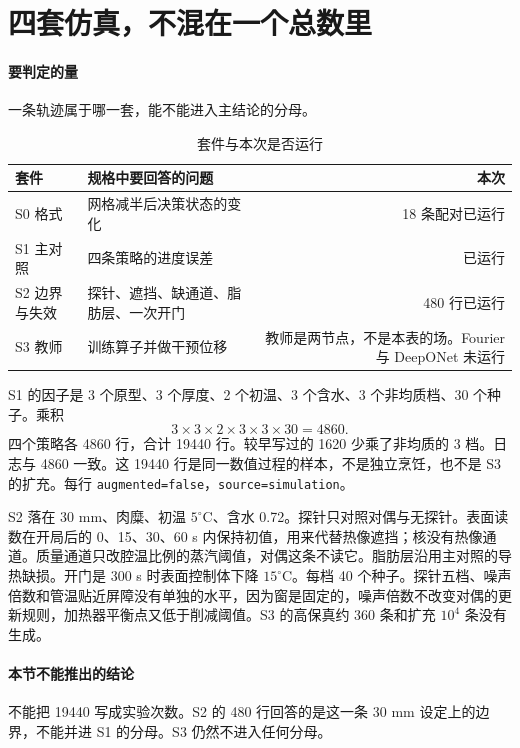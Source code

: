 \section{四套仿真，不混在一个总数里}

\paragraph{要判定的量}
一条轨迹属于哪一套，能不能进入主结论的分母。

\begin{table}[ht]
\centering
\caption{套件与本次是否运行}
\begin{tabularx}{\textwidth}{lXr}
\toprule
套件 & 规格中要回答的问题 & 本次 \\
\midrule
S0 格式 & 网格减半后决策状态的变化 & 18 条配对已运行 \\
S1 主对照 & 四条策略的进度误差 & 已运行 \\
S2 边界与失效 & 探针、遮挡、缺通道、脂肪层、一次开门 & 480 行已运行 \\
S3 教师 & 训练算子并做干预位移 & 教师是两节点，不是本表的场。Fourier 与 DeepONet 未运行 \\
\bottomrule
\end{tabularx}
\end{table}

S1 的因子是 3 个原型、3 个厚度、2 个初温、3 个含水、3 个非均质档、30 个种子。乘积
\begin{equation}
3\times 3\times 2\times 3\times 3\times 30=4860.
\end{equation}
四个策略各 4860 行，合计 19440 行。较早写过的 1620 少乘了非均质的 3 档。日志与 4860 一致。这 19440 行是同一数值过程的样本，不是独立烹饪，也不是 S3 的扩充。每行 \texttt{augmented=false}，\texttt{source=simulation}。

S2 落在 30 mm、肉糜、初温 \(5^\circ\mathrm{C}\)、含水 0.72。探针只对照对偶与无探针。表面读数在开局后的 0、15、30、60 s 内保持初值，用来代替热像遮挡；核没有热像通道。质量通道只改腔温比例的蒸汽阈值，对偶这条不读它。脂肪层沿用主对照的导热缺损。开门是 300 s 时表面控制体下降 \(15^\circ\mathrm{C}\)。每档 40 个种子。探针五档、噪声倍数和管温贴近屏障没有单独的水平，因为窗是固定的，噪声倍数不改变对偶的更新规则，加热器平衡点又低于削减阈值。S3 的高保真约 360 条和扩充 \(10^4\) 条没有生成。

\paragraph{本节不能推出的结论}
不能把 19440 写成实验次数。S2 的 480 行回答的是这一条 30 mm 设定上的边界，不能并进 S1 的分母。S3 仍然不进入任何分母。

